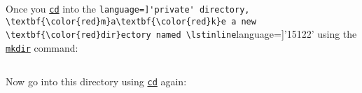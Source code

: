 \begin{part}
  Once you
  \underline{\lstinline[language={[coin]C}]'cd'} into the
    \lstinline[language=]'private' directory,
    \textbf{\color{red}m}a\textbf{\color{red}k}e a new
  \textbf{\color{red}dir}ectory named \lstinline[language=]'15122' using the
  \underline{\lstinline[language={[coin]C}]'mkdir'} command:
\begin{lstlisting}[language={[coin]C}]
% mkdir 15122
\end{lstlisting}
Now go into this directory using
  \underline{\lstinline[language={[coin]C}]'cd'} again:
\begin{lstlisting}[language={[coin]C}]
% cd 15122
\end{lstlisting}
\end{part}
